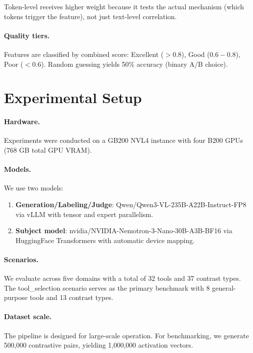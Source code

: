 \documentclass[runningheads]{llncs}
\begin{document}
Token-level receives higher weight because it tests the actual mechanism (which tokens trigger the feature), not just text-level correlation.

\paragraph{Quality tiers.} Features are classified by combined score: Excellent ($> 0.8$), Good ($0.6 - 0.8$), Poor ($< 0.6$). Random guessing yields 50\% accuracy (binary A/B choice).


\section{Experimental Setup}
\label{sec:experiments}

\paragraph{Hardware.} Experiments were conducted on a GB200 NVL4 instance with four B200 GPUs (768 GB total GPU VRAM).

\paragraph{Models.} We use two models:
\begin{enumerate}
\item \textbf{Generation/Labeling/Judge}: Qwen/Qwen3-VL-235B-A22B-Instruct-FP8 via vLLM with tensor and expert parallelism.
\item \textbf{Subject model}: nvidia/NVIDIA-Nemotron-3-Nano-30B-A3B-BF16 via HuggingFace Transformers with automatic device mapping.
\end{enumerate}

\paragraph{Scenarios.} We evaluate across five domains with a total of 32 tools and 37 contrast types. The tool\_selection scenario serves as the primary benchmark with 8 general-purpose tools and 13 contrast types.

\paragraph{Dataset scale.} The pipeline is designed for large-scale operation. For benchmarking, we generate 500,000 contrastive pairs, yielding 1,000,000 activation vectors.
\end{document}

